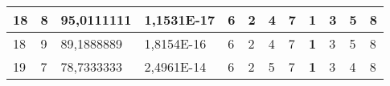 \documentclass[conference]{IEEEtran}
\begin{document}
\begin{table*}[]
\begin{tabular}{|llll|llllllll|}
\multicolumn{1}{|l|}{18}                                                    & \multicolumn{1}{l|}{8}                                                        & \multicolumn{1}{l|}{95,0111111}                                                   & 1,1531E-17                     & \multicolumn{1}{l|}{6}                                                  & \multicolumn{1}{l|}{2}                                                  & \multicolumn{1}{l|}{4}                                                  & \multicolumn{1}{l|}{7}                                                  & \multicolumn{1}{l|}{\textbf{1}}                                         & \multicolumn{1}{l|}{3}                                                  & \multicolumn{1}{l|}{5}                                                  & 8                          \\ \hline
\multicolumn{1}{|l|}{18}                                                    & \multicolumn{1}{l|}{9}                                                        & \multicolumn{1}{l|}{89,1888889}                                                   & 1,8154E-16                     & \multicolumn{1}{l|}{6}                                                  & \multicolumn{1}{l|}{2}                                                  & \multicolumn{1}{l|}{4}                                                  & \multicolumn{1}{l|}{7}                                                  & \multicolumn{1}{l|}{\textbf{1}}                                         & \multicolumn{1}{l|}{3}                                                  & \multicolumn{1}{l|}{5}                                                  & 8                          \\ \hline
\multicolumn{1}{|l|}{19}                                                    & \multicolumn{1}{l|}{7}                                                        & \multicolumn{1}{l|}{78,7333333}                                                   & 2,4961E-14                     & \multicolumn{1}{l|}{6}                                                  & \multicolumn{1}{l|}{2}                                                  & \multicolumn{1}{l|}{5}                                                  & \multicolumn{1}{l|}{7}                                                  & \multicolumn{1}{l|}{\textbf{1}}                                         & \multicolumn{1}{l|}{3}                                                  & \multicolumn{1}{l|}{4}                                                  & 8                          \\ \hline

\end{tabular}
\end{table*}
\end{document}
